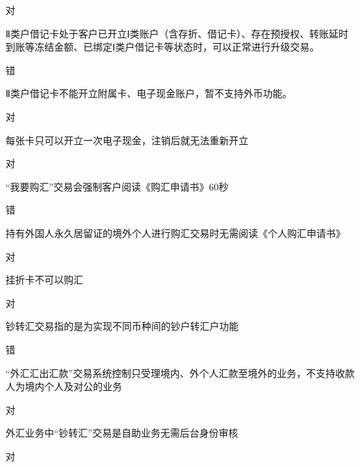 \documentclass[kindlepaper]{BHCexam4kindle}
\begin{document}
\begin{questions}
\begin{solution} 对 \end{solution}
\qs Ⅱ类户借记卡处于客户已开立Ⅰ类账户（含存折、借记卡）、存在预授权、转账延时到账等冻结金额、已绑定Ⅰ类户借记卡等状态时，可以正常进行升级交易。 \xx
\begin{solution} 错 \end{solution}
\qs Ⅱ类户借记卡不能开立附属卡、电子现金账户，暂不支持外币功能。 \xx
\begin{solution} 对 \end{solution}
\qs 每张卡只可以开立一次电子现金，注销后就无法重新开立 \xx
\begin{solution} 对 \end{solution}
\qs “我要购汇”交易会强制客户阅读《购汇申请书》60秒 \xx
\begin{solution} 错 \end{solution}
\qs 持有外国人永久居留证的境外个人进行购汇交易时无需阅读《个人购汇申请书》 \xx
\begin{solution} 对 \end{solution}
\qs 挂折卡不可以购汇 \xx
\begin{solution} 对 \end{solution}
\qs 钞转汇交易指的是为实现不同币种间的钞户转汇户功能 \xx
\begin{solution} 错 \end{solution}
\qs “外汇汇出汇款”交易系统控制只受理境内、外个人汇款至境外的业务，不支持收款人为境内个人及对公的业务 \xx
\begin{solution} 对 \end{solution}
\qs 外汇业务中“钞转汇”交易是自助业务无需后台身份审核 \xx
\begin{solution} 对 \end{solution}

\end{questions}
\end{document}
